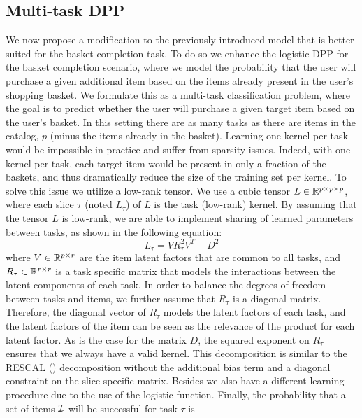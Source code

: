 \subsection{Multi-task DPP}
We now propose a modification to the previously introduced model that is better
suited for the basket completion task. 
To do so we enhance the logistic DPP for the basket completion scenario, where we model the probability that the user will purchase a
given additional item based on the items already present in the user's shopping basket.
We formulate this as a multi-task classification problem, where the goal is
to predict whether the user will purchase a given target item based on the
user's basket. In this setting there are as many tasks as there are items in the
catalog, $p$ (minus the items already in the basket). Learning one kernel per
task would be impossible in practice and suffer from sparsity issues. Indeed,
with one kernel per task, each target item would be present in only a fraction
of the baskets, and thus dramatically reduce the size of the training set per
kernel. To solve this issue we utilize a low-rank tensor. We use a cubic tensor
$L \in \mathbb{R}^{p \times p \times p}$, where each slice $\tau$ (noted $L_{\tau}$) of
$L$ is the task (low-rank) kernel. By assuming that the tensor $L$ is low-rank,
we are able to implement sharing of learned parameters between tasks, as shown in
the following equation:
\begin{equation}
\label{rescal_decomposition}
L_{\tau} = V R_{\tau}^2 V^T + D^2
\end{equation}
where $V \in \mathbb{R}^{p \times r}$ are the item latent factors that are common to all
tasks, and $R_{\tau} \in \mathbb{R}^{r \times r}$ is a task specific matrix that models
the interactions between the latent components of each task. In order to balance
the degrees of freedom between tasks and items, we further assume that $R_{\tau}$ is
a diagonal matrix. Therefore, the diagonal vector of $R_{\tau}$ models the latent
factors of each task, and the latent factors of the item can be seen as the
relevance of the product for each latent factor. As is the case for the matrix $D$, the
squared exponent on $R_{\tau}$ ensures that we always have a valid kernel.
This decomposition is similar to the RESCAL (\cite{ICML2011Nickel_438}) decomposition without the additional bias term and a diagonal constraint on the slice specific matrix. 
Besides we also have a different learning procedure due to the use of the logistic function.  
Finally, the probability that a set of items $\mathcal{I}$ will be successful for task
$\tau$ is
